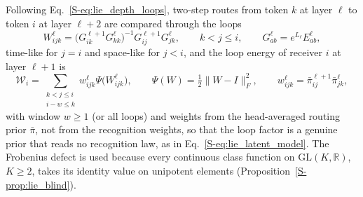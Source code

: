 \documentclass[11pt]{article}
\theoremstyle{definition}
\theoremstyle{remark}
\providecommand{\GL}{\mathrm{GL}}
\newcommand{\R}{\mathbb R}
\newcommand{\Sref}[1]{\ref{S-#1}}
\begin{document}
Following Eq.~\Sref{eq:lie_depth_loops}, two-step routes from token $k$ at layer $\ell$ to token $i$ at layer $\ell+2$ are compared through the loops
\begin{equation}
W_{ijk}^\ell=\bigl(G_{ik}^{\ell+1}G_{kk}^\ell\bigr)^{-1}G_{ij}^{\ell+1}G_{jk}^\ell,\qquad k<j\le i,\qquad G^\ell_{ab}=e^{L_\ell}E^\ell_{ab},
\label{eq:loops}
\end{equation}
time-like for $j=i$ and space-like for $j<i$, and the loop energy of receiver $i$ at layer $\ell+1$ is
\begin{equation}
\mathcal W_i=\sum_{\substack{k<j\le i\\ i-w\le k}}w_{ijk}^\ell\Psi\bigl(W_{ijk}^\ell\bigr),\qquad\Psi(W)=\tfrac12\|W-I\|_F^2,\qquad w_{ijk}^\ell=\bar\pi_{ij}^{\ell+1}\bar\pi_{jk}^\ell,
\label{eq:loop_energy}
\end{equation}
with window $w\ge1$ (or all loops) and weights from the head-averaged routing prior $\bar\pi$, not from the recognition weights, so that the loop factor is a genuine prior that reads no recognition law, as in Eq.~\Sref{eq:lie_latent_model}. The Frobenius defect is used because every continuous class function on $\GL(K,\R)$, $K\ge2$, takes its identity value on unipotent elements (Proposition~\Sref{prop:lie_blind}).
\end{document}
